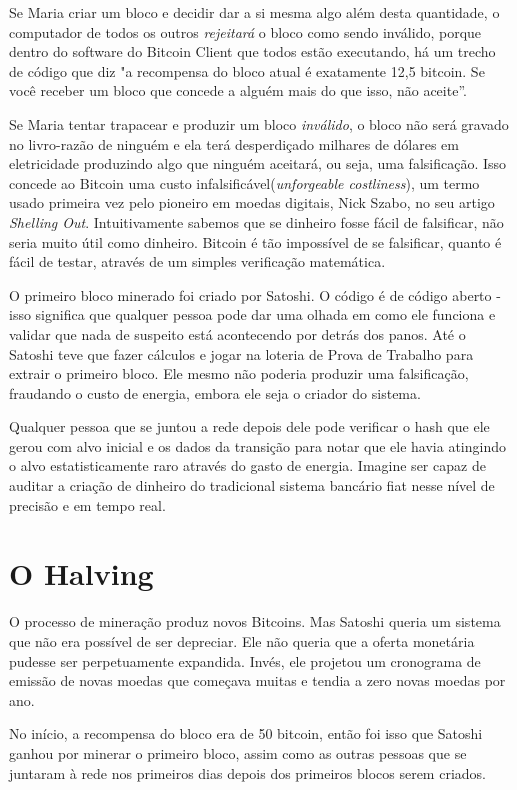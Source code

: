 Se Maria criar um bloco e decidir dar a si mesma algo além desta quantidade, o computador de todos os outros \textit{rejeitará} o bloco como sendo inválido, porque dentro do software do Bitcoin Client que todos estão executando, há um trecho de código que diz "a recompensa do bloco atual é exatamente 12,5 bitcoin. Se você receber um bloco que concede a alguém mais do que isso, não aceite”.

Se Maria tentar trapacear e produzir um bloco \textit{inválido}, o bloco não será gravado no livro-razão de ninguém e ela terá desperdiçado milhares de dólares em eletricidade produzindo algo que ninguém aceitará, ou seja, uma falsificação.
Isso concede ao Bitcoin uma custo infalsificável(\textit{unforgeable costliness}), um termo usado primeira vez pelo pioneiro em moedas digitais, Nick Szabo, no seu artigo \textit{Shelling Out}. Intuitivamente sabemos que se dinheiro fosse fácil de falsificar, não seria muito útil como dinheiro. Bitcoin é tão impossível de se falsificar, quanto é fácil de testar, através de um simples verificação matemática.
  
O primeiro bloco minerado foi criado por Satoshi. O código é de código aberto - isso significa que qualquer pessoa pode dar uma olhada em como ele funciona e validar que nada de suspeito está acontecendo por detrás dos panos. Até o Satoshi teve que fazer cálculos e jogar na loteria de Prova de Trabalho para extrair o primeiro bloco.
Ele mesmo não poderia produzir uma falsificação, fraudando o custo de energia, embora ele seja o criador do sistema.

Qualquer pessoa que se juntou a rede depois dele pode verificar o hash que ele gerou com alvo inicial e os dados da transição para notar que ele havia atingindo o alvo estatisticamente raro através do gasto de energia. Imagine ser capaz de auditar a criação de dinheiro do tradicional sistema bancário fiat nesse nível de precisão e em tempo real.

\section*{O Halving}
O processo de mineração produz novos Bitcoins. Mas Satoshi queria um sistema que não era possível de ser depreciar. Ele não queria que a oferta monetária pudesse ser perpetuamente expandida. Invés, ele projetou um cronograma de emissão de novas moedas que começava muitas e tendia a zero novas moedas por ano.

No início, a recompensa do bloco era de 50 bitcoin, então foi isso que Satoshi ganhou por minerar o primeiro bloco, assim como as outras pessoas que se juntaram à rede nos primeiros dias depois dos primeiros blocos serem criados.


